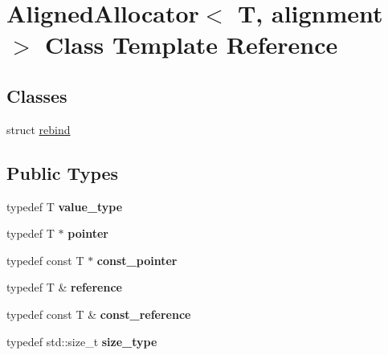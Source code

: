 \hypertarget{classAlignedAllocator}{}\section{Aligned\+Allocator$<$ T, alignment $>$ Class Template Reference}
\label{classAlignedAllocator}
\subsection*{Classes}
\begin{DoxyCompactItemize}
\item 
struct \hyperlink{structAlignedAllocator_1_1rebind}{rebind}
\end{DoxyCompactItemize}
\subsection*{Public Types}
\begin{DoxyCompactItemize}
\item 
typedef T {\bfseries value\+\_\+type}\hypertarget{classAlignedAllocator_a8156c3bcb3f481eee1ed5744f1bee588}{}\label{classAlignedAllocator_a8156c3bcb3f481eee1ed5744f1bee588}

\item 
typedef T $\ast$ {\bfseries pointer}\hypertarget{classAlignedAllocator_ace173cbb585102f35337af6a2f0773d0}{}\label{classAlignedAllocator_ace173cbb585102f35337af6a2f0773d0}

\item 
typedef const T $\ast$ {\bfseries const\+\_\+pointer}\hypertarget{classAlignedAllocator_aa0023d9d0cd46d1436908ca3438b4253}{}\label{classAlignedAllocator_aa0023d9d0cd46d1436908ca3438b4253}

\item 
typedef T \& {\bfseries reference}\hypertarget{classAlignedAllocator_aa7ea4f8ae44e6681548689059258f7ed}{}\label{classAlignedAllocator_aa7ea4f8ae44e6681548689059258f7ed}

\item 
typedef const T \& {\bfseries const\+\_\+reference}\hypertarget{classAlignedAllocator_a1f9389d4b2f98606022504b1695945b7}{}\label{classAlignedAllocator_a1f9389d4b2f98606022504b1695945b7}

\item 
typedef std\+::size\+\_\+t {\bfseries size\+\_\+type}\hypertarget{classAlignedAllocator_ab6e51b4656a9e595dce6cb55d5386aac}{}\label{classAlignedAllocator_ab6e51b4656a9e595dce6cb55d5386aac}

\end{DoxyCompactItemize}
